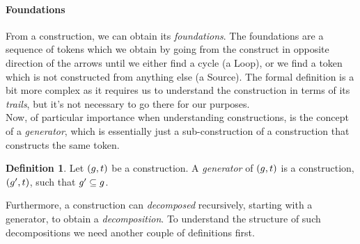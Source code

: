 \documentclass[a4paper]{article}
\theoremstyle{definition}
\newtheorem{definition}{Definition}
\begin{document}
		\paragraph{Foundations} From a construction, we can obtain its \textit{foundations}. The foundations are a sequence of tokens which we obtain by going from the construct in opposite direction of the arrows until we either find a cycle (a Loop), or we find a token which is not constructed from anything else (a Source). The formal definition is a bit more complex as it requires us to understand the construction in terms of its \textit{trails}, but it's not necessary to go there for our purposes.\\

		Now, of particular importance when understanding constructions, is the concept of a \textit{generator}, which is essentially just a sub-construction of a construction that constructs the same token.

		\begin{definition}
			Let $(g,t)$ be a construction. A \textit{generator} of $(g,t)$ is a construction, $(g',t)$, such that $g'\subseteq g$.
		\end{definition}

%
%

		Furthermore, a construction can \textit{decomposed} recursively, starting with a generator, to obtain a \textit{decomposition}. To understand the structure of such decompositions we need another couple of definitions first.
\end{document}
